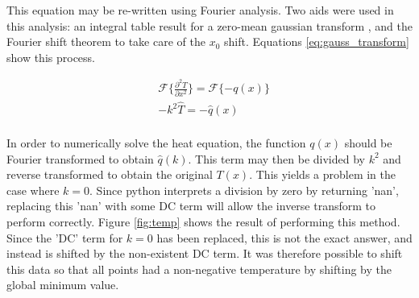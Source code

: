 \documentclass[twocolumn]{article}
\begin{document}
This equation may be re-written using Fourier analysis. Two aids were used in this analysis: an integral table result for a zero-mean gaussian transform \cite{gauss_trans}, and the Fourier shift theorem to take care of the $x_0$ shift. Equations \ref{eq:gauss_transform} show this process.

\begin{equation}
\begin{split}
&\mathcal{F}\{ \frac{\partial^2 T}{\partial x^2} \} = \mathcal{F} \{ -q(x) \} \\
&-k^2 \hat{T} = -\hat{q}(x) \\
%
\end{split}
\label{eq:gauss_transform}
\end{equation}

In order to numerically solve the heat equation, the function $q(x)$ should be Fourier transformed to obtain $\hat{q}(k)$. This term may then be divided by $k^2$ and reverse transformed to obtain the original $T(x)$. This yields a problem in the case where $k=0$. Since python interprets a division by zero by returning 'nan', replacing this 'nan' with some DC term will allow the inverse transform to perform correctly. Figure \ref{fig:temp} shows the result of performing this method. Since the 'DC' term for $k=0$ has been replaced, this is not the exact answer, and instead is shifted by the non-existent DC term. It was therefore possible to shift this data so that all points had a non-negative temperature by shifting by the global minimum value. 
\end{document}
